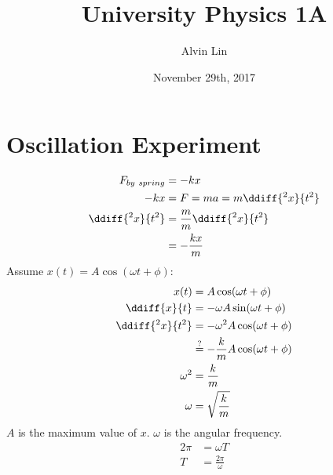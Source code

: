 \documentclass{math}
\title{University Physics 1A}
\author{Alvin Lin}
\date{November 29th, 2017}
\begin{document}
\section*{Oscillation Experiment}
\begin{align*}
  F_{by~spring} &= -kx \\
  -kx &= F = ma = m\ddiff{^2x}{t^2} \\
  \ddiff{^2x}{t^2} &= \frac{m}{m}\ddiff{^2x}{t^2} \\
  &= -\frac{kx}{m} \\
\end{align*}
Assume \( x(t) = A\cos(\omega t+\phi) \):
\begin{align*}
  x(t) &= A\cos(\omega t+\phi) \\
  \ddiff{x}{t} &= -\omega A\sin(\omega t+\phi) \\
  \ddiff{^2x}{t^2} &= -\omega^2A\cos(\omega t+\phi) \\
  &\stackrel{?}{=} -\frac{k}{m}A\cos(\omega t+\phi) \\
  \omega^2 &= \frac{k}{m} \\
  \omega &= \sqrt{\frac{k}{m}}
\end{align*}
\( A \) is the maximum value of \( x \). \( \omega \) is the angular frequency.
\begin{align*}
  2\pi &= \omega T \\
  T &= \frac{2\pi}{\omega}
\end{align*}

\maketitle
\end{document}
